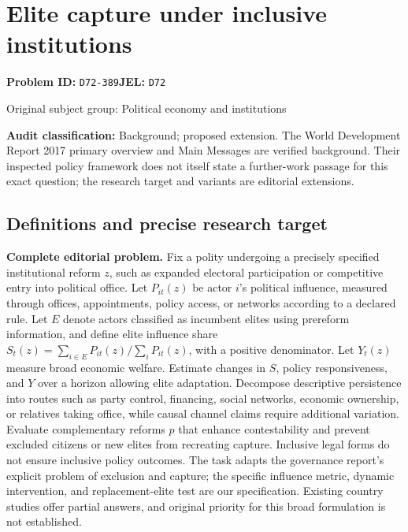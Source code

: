 \documentclass[11pt,a4paper]{article}
\begin{document}
\section*{Elite capture under inclusive institutions}
\textbf{Problem ID:} \texttt{D72-389}\quad \textbf{JEL:} \texttt{D72}\par
\label{problem:OP-0385}
{\sffamily\small\color{muted}Original subject group: Political economy and institutions\par}
\label{definitions:problem:30007667}
\textbf{Audit classification:} Background; proposed extension. The World Development Report 2017 primary overview and Main Messages are verified background. Their inspected policy framework does not itself state a further-work passage for this exact question; the research target and variants are editorial extensions.
\subsection*{Definitions and precise research target}
\textbf{Complete editorial problem.} Fix a polity undergoing a precisely specified institutional reform \(z\), such as expanded electoral participation or competitive entry into political office. Let \(P_{it}(z)\) be actor \(i\)'s political influence, measured through offices, appointments, policy access, or networks according to a declared rule. Let \(E\) denote actors classified as incumbent elites using prereform information, and define elite influence share \(S_t(z)=\sum_{i\in E}P_{it}(z)/\sum_iP_{it}(z)\), with a positive denominator. Let \(Y_t(z)\) measure broad economic welfare. Estimate changes in \(S\), policy responsiveness, and \(Y\) over a horizon allowing elite adaptation. Decompose descriptive persistence into routes such as party control, financing, social networks, economic ownership, or relatives taking office, while causal channel claims require additional variation. Evaluate complementary reforms \(p\) that enhance contestability and prevent excluded citizens or new elites from recreating capture. Inclusive legal forms do not ensure inclusive policy outcomes. The task adapts the governance report's explicit problem of exclusion and capture; the specific influence metric, dynamic intervention, and replacement-elite test are our specification. Existing country studies offer partial answers, and original priority for this broad formulation is not established.
\end{document}
